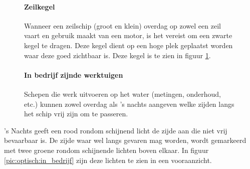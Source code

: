\begin{figure}[H]
	\centering
	\begin{minipage}[t]{0.75\textwidth}
		\paragraph{Zeilkegel}
		Wanneer een zeilschip (groot en klein) overdag op zowel een zeil vaart en gebruik maakt van een motor, is het vereist om een zwarte kegel te dragen. Deze kegel dient op een hoge plek geplaatst worden waar deze goed zichtbaar is. Deze kegel is te zien in figuur \ref{pic:optisch:zeilkegel}.
	\end{minipage}
	\hfill
	\begin{minipage}[t]{0.22\textwidth}
		\RemoveLine
		\caption{}
		\label{pic:optisch:zeilkegel}
	\end{minipage}
\end{figure}

\begin{figure}[H]
	\centering
	\begin{minipage}[t]{0.50\textwidth}
		\paragraph{In bedrijf zijnde werktuigen}
		Schepen die werk uitvoeren op het water (metingen, onderhoud, etc.) kunnen zowel overdag als 's nachts aangeven welke zijden langs het schip vrij zijn om te passeren. 
	\end{minipage}
	\hfill
		\begin{minipage}[t]{0.22\textwidth}
		\RemoveLine
		\caption{}
		\label{pic:optisch:in_bedrijf}
	\end{minipage}
	\hfill
	\begin{minipage}[t]{0.22\textwidth}
		\RemoveLine
		\caption{}
		\label{pic:optisch:in_bedrijf2}
	\end{minipage}
\end{figure}
\vspace{-0.6cm}%
's Nachts geeft een rood rondom schijnend licht de zijde aan die niet vrij bevaarbaar is. De zijde waar wel langs gevaren mag worden, wordt gemarkeerd met twee groene rondom schijnende lichten boven elkaar. In figuur \ref{pic:optisch:in_bedrijf} zijn deze lichten te zien in een vooraanzicht.

